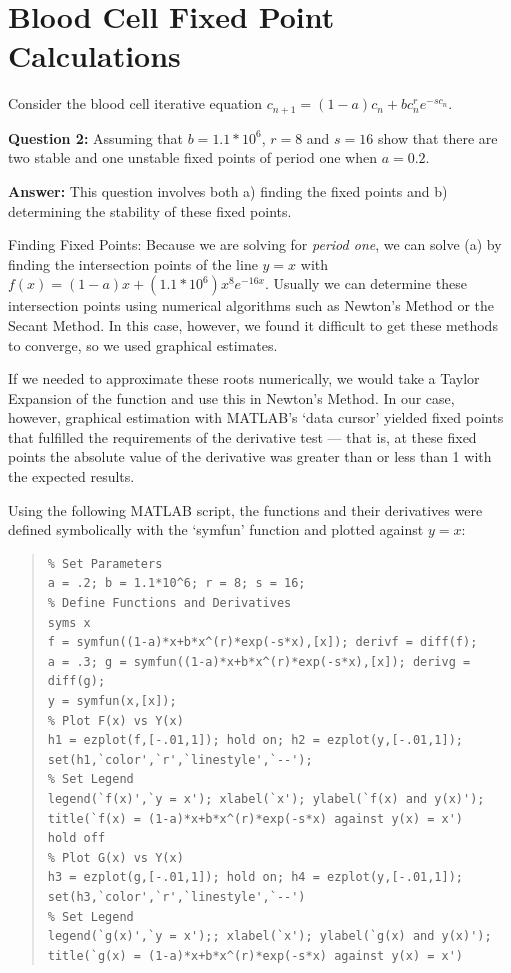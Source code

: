 \section*{Blood Cell Fixed Point Calculations}
Consider the blood cell iterative equation $c_{n+1} = (1-a)c_{n}+bc_{n}^{r}e^{-sc_{n}}$.

\textbf{Question 2:} Assuming that $b=1.1*10^{6}$, $r=8$ and $s=16$ show that there are two stable and one unstable fixed points of period one when $a=0.2$.

\textbf{Answer:} This question involves both a) finding the fixed points and b) determining the stability of these fixed points. 

Finding Fixed Points: Because we are solving for \emph{period one}, we can solve (a) by finding the intersection points of the line $y=x$ with $f(x) = (1-a)x+(1.1*10^{6})x^{8}e^{-16x}$. Usually we can determine these intersection points using numerical algorithms such as Newton's Method or the Secant Method. In this case, however, we found it difficult to get these methods to converge, so we used graphical estimates. 

If we needed to approximate these roots numerically, we would take a Taylor Expansion of the function and use this in Newton's Method. In our case, however, graphical estimation with MATLAB's `data cursor' yielded fixed points that fulfilled the requirements of the derivative test --- that is, at these fixed points the absolute value of the derivative was greater than or less than 1 with the expected results.

Using the following MATLAB script, the functions and their derivatives were defined symbolically with the `symfun' function and plotted against $y=x$:

\begin{quote}
	\begin{verbatim}
% Set Parameters
a = .2; b = 1.1*10^6; r = 8; s = 16;
% Define Functions and Derivatives
syms x
f = symfun((1-a)*x+b*x^(r)*exp(-s*x),[x]); derivf = diff(f);
a = .3; g = symfun((1-a)*x+b*x^(r)*exp(-s*x),[x]); derivg = diff(g);
y = symfun(x,[x]);
% Plot F(x) vs Y(x)
h1 = ezplot(f,[-.01,1]); hold on; h2 = ezplot(y,[-.01,1]); 
set(h1,`color',`r',`linestyle',`--');
% Set Legend 
legend(`f(x)',`y = x'); xlabel(`x'); ylabel(`f(x) and y(x)');
title(`f(x) = (1-a)*x+b*x^(r)*exp(-s*x) against y(x) = x')
hold off
% Plot G(x) vs Y(x)
h3 = ezplot(g,[-.01,1]); hold on; h4 = ezplot(y,[-.01,1]);
set(h3,`color',`r',`linestyle',`--')
% Set Legend
legend(`g(x)',`y = x');; xlabel(`x'); ylabel(`g(x) and y(x)'); 
title(`g(x) = (1-a)*x+b*x^(r)*exp(-s*x) against y(x) = x')
\end{verbatim}
\end{quote}


